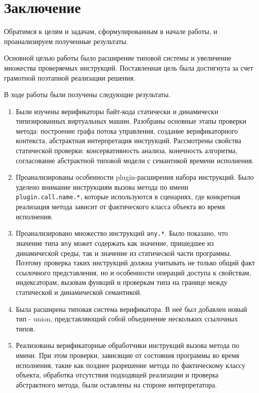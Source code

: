 \section{Заключение}
\label{sec:Chapter5} 

Обратимся к целям и задачам, сформулированным в начале работы, и проанализируем
полученные результаты.

Основной целью работы было расширение типовой системы и увеличение множества проверяемых
инструкций. Поставленная цель была
достигнута за счет грамотной поэтапной реализации решения.

В ходе работы были получены следующие результаты.
\begin{enumerate}
    \item Были изучены верификаторы байт-кода статически и динамически типизированных 
    виртуальных машин. Разобраны основные
    этапы проверки метода: построение
    графа потока управления, создание верификаторного контекста,
    абстрактная интерпретация инструкций. Рассмотрены свойства
    статической проверки:
    консервативность анализа, конечность алгоритма,
    согласование абстрактной типовой модели с семантикой времени исполнения.

    \item Проанализированы особенности plugin-расширения набора инструкций.
    Было уделено внимание инструкциям вызова метода по имени \newline
    \texttt{plugin.call.name.*}, которые используются в сценариях, где конкретная
    реализация метода зависит от фактического класса объекта во время
    исполнения.

    \item Проанализировано множество инструкций \texttt{any.*}. Было
    показано, что значение типа \texttt{any} может содержать как значение,
    пришедшее из динамической среды, так и значение из статической части
    программы. Поэтому проверка таких инструкций должна учитывать не только
    общий факт ссылочного представления, но и особенности операций доступа к
    свойствам, индексаторам, вызовам функций и проверкам типа на границе между
    статической и динамической семантикой.

    \item Была расширена типовая система верификатора. В неё был добавлен
    новый тип - union, представляющий собой объединение нескольких ссылочных типов.

    \item Реализованы верификаторные обработчики инструкций вызова метода по имени.
    При этом проверки, зависящие от состояния
    программы во время исполнения, такие как позднее разрешение метода по
    фактическому классу объекта, обработка отсутствия подходящей реализации и
    проверка абстрактного метода, были оставлены на стороне интерпретатора.


\end{enumerate}
